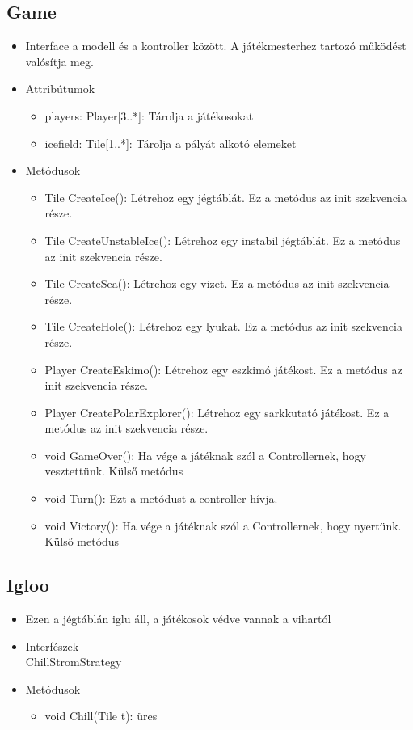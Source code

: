 \subsection{Game}
\begin{itemize}
	\item Interface a modell és a kontroller között. A játékmesterhez tartozó működést valósítja meg.\\
	
\item Attribútumok\\

\begin{itemize}
	\item players: Player[3..*]: Tárolja a játékosokat
	\item icefield: Tile[1..*]: Tárolja a pályát alkotó elemeket
\end{itemize}
\item Metódusok\\
\begin{itemize}
	\item Tile CreateIce(): Létrehoz egy jégtáblát. Ez a metódus az init szekvencia része.
	\item Tile CreateUnstableIce(): Létrehoz egy instabil jégtáblát. Ez a metódus az init szekvencia része.
	\item Tile CreateSea(): Létrehoz egy vizet. Ez a metódus az init szekvencia része.
	\item Tile CreateHole(): Létrehoz egy lyukat. Ez a metódus az init szekvencia része.
	\item Player CreateEskimo(): Létrehoz egy eszkimó játékost. Ez a metódus az init szekvencia része.
	\item Player CreatePolarExplorer(): Létrehoz egy sarkkutató játékost. Ez a metódus az init szekvencia része.
	\item void GameOver(): Ha vége a játéknak szól a Controllernek, hogy vesztettünk. Külső metódus
	\item void Turn(): Ezt a metódust a controller hívja. 
	\item void Victory(): Ha vége a játéknak szól a Controllernek, hogy nyertünk. Külső metódus
\end{itemize}
\end{itemize}

\subsection{Igloo}
\begin{itemize}
	\item Ezen a jégtáblán iglu áll, a játékosok védve vannak a vihartól\\
	
\item Interfészek\\
ChillStromStrategy
\item Metódusok
\begin{itemize}
	\item void Chill(Tile t): üres
\end{itemize}
\end{itemize}

